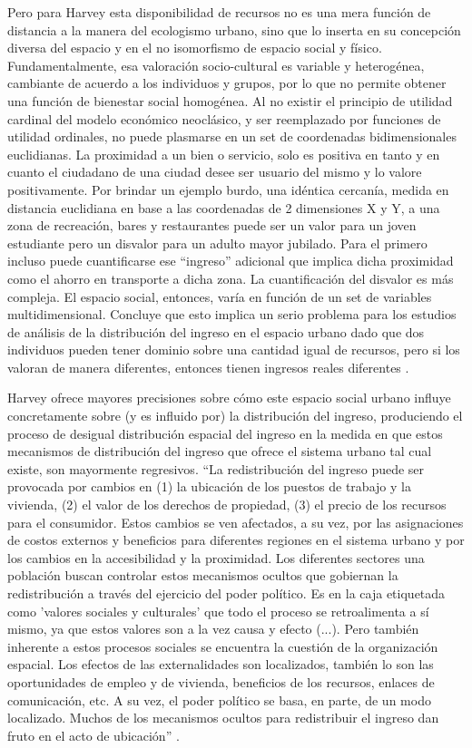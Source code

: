 Pero para Harvey esta disponibilidad de recursos no es una mera función de distancia a la manera del ecologismo urbano, sino que lo inserta en su concepción diversa del espacio y en el no isomorfismo de espacio social y físico. Fundamentalmente, esa valoración socio-cultural es variable y heterogénea, cambiante de acuerdo a los individuos y grupos, por lo que no permite obtener una función de bienestar social homogénea. Al no existir el principio de utilidad cardinal del modelo económico neoclásico, y ser reemplazado por funciones de utilidad ordinales, no puede plasmarse en un set de coordenadas bidimensionales euclidianas. La proximidad a un bien o servicio, solo es positiva en tanto y en cuanto el ciudadano de una ciudad desee ser usuario del mismo y lo valore positivamente. Por brindar un ejemplo burdo, una idéntica cercanía, medida en distancia euclidiana en base a las coordenadas de 2 dimensiones X y Y, a una zona de recreación, bares y restaurantes puede ser un valor para un joven estudiante pero un disvalor para un adulto mayor jubilado. Para el primero incluso puede cuantificarse ese “ingreso” adicional que implica dicha proximidad como el ahorro en transporte a dicha zona. La cuantificación del disvalor es más compleja. El espacio social, entonces, varía en función de un set de variables multidimensional. Concluye que esto implica un serio problema para los estudios de análisis de la distribución del ingreso en el espacio urbano dado que dos individuos pueden tener dominio sobre una cantidad igual de recursos, pero si los valoran de manera diferentes, entonces tienen ingresos reales diferentes \cite[p.~81]{harvey}.

Harvey ofrece mayores precisiones sobre cómo este espacio social urbano influye concretamente sobre (y es influido por) la distribución del ingreso, produciendo el proceso de desigual distribución espacial del ingreso en la medida en que estos mecanismos de distribución del ingreso que ofrece el sistema urbano tal cual existe, son mayormente regresivos. “La redistribución del ingreso puede ser provocada por cambios en (1) la ubicación de los puestos de trabajo y la vivienda, (2) el valor de los derechos de propiedad, (3) el precio de los recursos para el consumidor. Estos cambios se ven afectados, a su vez, por las asignaciones de costos externos y beneficios para diferentes regiones en el sistema urbano y por los cambios en la accesibilidad y la proximidad. Los diferentes sectores una población buscan controlar estos mecanismos ocultos que gobiernan la redistribución a través del ejercicio del poder político. Es en la caja etiquetada como 'valores sociales y culturales' que todo el proceso se retroalimenta a sí mismo, ya que estos valores son a la vez causa y efecto (...). Pero también inherente a estos procesos sociales se encuentra la cuestión de la organización espacial. Los efectos de las externalidades son localizados, también lo son las oportunidades de empleo y de vivienda, beneficios de los recursos, enlaces de comunicación, etc. A su vez, el poder político se basa, en parte, de un modo localizado. Muchos de los mecanismos ocultos para redistribuir el ingreso dan fruto en el acto de ubicación” \cite[p.~86]{harvey}.

